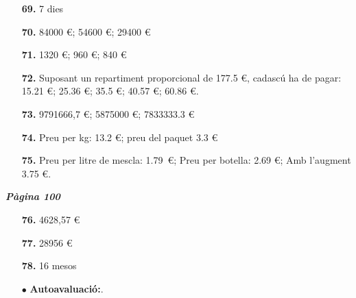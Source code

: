 \documentclass[a4paper, pdf, twoside]{book}
\begin{document}
\begin{multicols}{2}
\begin{enumerate}
\item[\fontfamily{phv}\selectfont\color{blue}\textbf{69. }] 
7 dies
\vspace{0.25cm}
\item[\fontfamily{phv}\selectfont\color{blue}\textbf{70. }] 
84000 \euro {}; 54600 \euro {}; 29400 \euro {}
\vspace{0.25cm}
\item[\fontfamily{phv}\selectfont\color{blue}\textbf{71. }] 
1320 \euro {}; 960 \euro {}; 840 \euro {}
\vspace{0.25cm}
\item[\fontfamily{phv}\selectfont\color{blue}\textbf{72. }] 
Suposant un repartiment proporcional de 177.5 \euro {}, cadascú ha de pagar: 15.21 \euro {}; 25.36 \euro {}; 35.5 \euro {}; 40.57 \euro {}; 60.86 \euro {}.
\vspace{0.25cm}
\item[\fontfamily{phv}\selectfont\color{blue}\textbf{73. }] 
9791666,7 \euro {}; 5875000 \euro {}; 7833333.3 \euro {}
\vspace{0.25cm}
\item[\fontfamily{phv}\selectfont\color{blue}\textbf{74. }] 
Preu per kg: 13.2 \euro {}; preu del paquet 3.3 \euro {}
\vspace{0.25cm}
\item[\fontfamily{phv}\selectfont\color{blue}\textbf{75. }] 
Preu per litre de mescla: 1.79 \euro {}; Preu per botella: 2.69 \euro {}; Amb l'augment 3.75 \euro {}.
 \end{enumerate}
\vspace{0.3cm}


{\textbf{\em Pàgina 100}} \hrulefill
\begin{enumerate}
\vspace{0.25cm}
\item[\fontfamily{phv}\selectfont\color{blue}\textbf{76. }] 
4628,57 \euro {}
 \end{enumerate}
\begin{enumerate}
\vspace{0.25cm}
\item[\fontfamily{phv}\selectfont\color{blue}\textbf{77. }] 
28956 \euro {}
\vspace{0.25cm}
\item[\fontfamily{phv}\selectfont\color{blue}\textbf{78. }] 
16 mesos
\vspace{0.25cm}
 \item[$\bullet$ ] {\selectfont\color{blue}\textbf{Autoavaluació:}. }


\end{enumerate}
\end{multicols}
\end{document}
